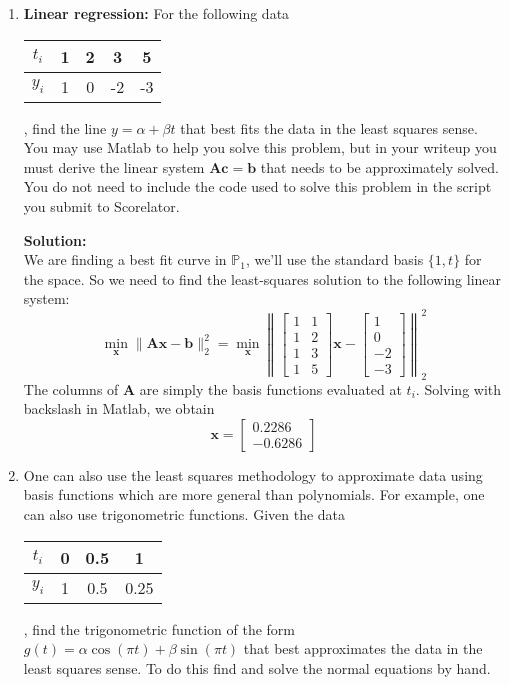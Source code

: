 \documentclass[]{article}
\newcommand{\bbm}{\begin{bmatrix}}		%
\newcommand{\ebm}{\end{bmatrix}}		%
\newcommand{\x}{\bm{x}}					%
\newcommand{\A}{\bm{A}}					%
\newcommand{\solution}{\vskip 0.5cm \textbf{\large Solution:} \\}
\begin{document}
\begin{enumerate}
	\item \textbf{Linear regression:} For the following data \begin{tabular}{c|cccc}$t_i$&1&2&3&5\\ \hline$y_i$&1&0&-2&-3\end{tabular}, find the line $y=\alpha + \beta t$ that best fits the data in the least squares sense. You may use Matlab to help you solve this problem, but in your writeup you must derive the linear system $\A\bm{c}=\bm{b}$ that needs to be approximately solved. You do not need to include the code used to solve this problem in the script you submit to Scorelator.

	  \solution We are finding a best fit curve in $\mathbb{P}_1$,
      we'll use the standard basis $\{1, t\}$ for the space. So we
      need to find the least-squares solution to the following linear
      system:
      \[
      \min_{\x} \|\A\x - \bm{b}\|_2^2 = \min_{\x} \left\|\bbm 1 & 1 \\ 1 & 2 \\ 1 & 3 \\ 1 & 5 \ebm \x - \bbm 1\\0\\-2\\-3 \ebm \right\|_2^2
      \]
      The columns of $\A$ are simply the basis functions evaluated at $t_i$. Solving with backslash in Matlab, we obtain
      $$ \x = \bbm 0.2286 \\ -0.6286 \ebm $$

	\item One can also use the least squares methodology to approximate data using basis functions which are more general than polynomials. For example, one can also use trigonometric functions. Given the data \begin{tabular}{c|ccc}$t_i$&0&0.5&1\\\hline $y_i$&1&0.5&0.25\end{tabular}, find the trigonometric function of the form $g(t)=\alpha \cos(\pi t)+\beta\sin(\pi t)$ that best approximates the data in the least squares sense. To do this find and solve the normal equations by hand.


\end{enumerate}
\end{document}
